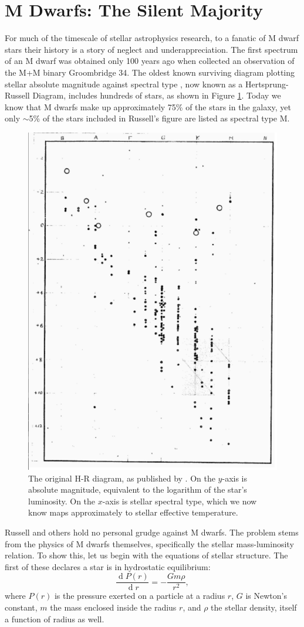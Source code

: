 \documentclass[12pt]{caltech_thesis}
\renewcommand{\d}[1]{\ensuremath{\operatorname{d}\!{#1}}}
\begin{document}
\section{M Dwarfs: The Silent Majority}
For much of the timescale of stellar astrophysics research, to a fanatic 
of M dwarf stars their history is a story of neglect and underappreciation.
The first spectrum of an M dwarf was obtained only 100 years ago when 
\citet{Adams13} collected an observation of the M+M binary Groombridge 34.
The oldest known surviving diagram plotting stellar absolute magnitude against spectral type \citep{Russell14}, now known as a Hertsprung-Russell Diagram, includes hundreds of stars, as shown in Figure \ref{fig:HR}.
Today we know that M dwarfs make up approximately 75\% of the stars in the galaxy,
yet only $\sim$5\% of the stars included in Russell's figure are listed as
spectral type M.



\begin{figure}[hbt!]
\centering
\includegraphics[width=.5\textwidth]{hr.png}
\caption[Russell's original H-R Diagram]{The original H-R diagram, as published by
\citet{Russell14}. On the $y$-axis is absolute magnitude, equivalent to the logarithm
of the star's luminosity. On the $x$-axis is stellar spectral type, which we now know
maps approximately to stellar effective temperature.}
\label{fig:HR}
\end{figure}

Russell and others hold no personal grudge against M dwarfs. The problem stems from the physics
of M dwarfs themselves, specifically the stellar mass-luminosity relation.
To show this, let us begin with the equations of stellar structure.
The first of these declares a star is in hydrostatic equilibrium:
\begin{equation}
\frac{\d P(r)}{\d r} = - \frac{ G m \rho}{r^2 },
\label{eq:hydro}
\end{equation}
where $P(r)$ is the pressure exerted on a particle at a radius $r$, $G$ is Newton's
constant, $m$ the mass enclosed inside the radius $r$, and $\rho$ the stellar density,
itself a function of radius as well.
\end{document}
